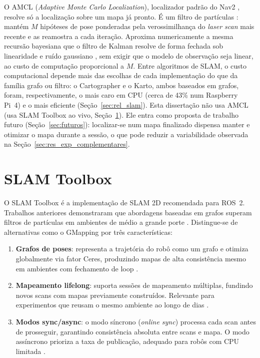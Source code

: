 O AMCL (\textit{Adaptive Monte Carlo Localization}), localizador padrão do
Nav2 \cite{macenski2020marathon}, resolve só a localização sobre um mapa já pronto. É um filtro de
partículas \cite{thrun2005}: mantém $M$ hipóteses de pose ponderadas pela verossimilhança do
\textit{laser scan} mais recente e as reamostra a cada iteração. Aproxima
numericamente a mesma recursão bayesiana que o filtro de Kalman resolve de
forma fechada sob linearidade e ruído gaussiano \cite{kalman1960}, sem exigir
que o modelo de observação seja linear, ao custo de computação proporcional a
$M$. Entre algoritmos de SLAM, o custo computacional depende mais das escolhas
de cada implementação do que da família grafo ou filtro: o Cartographer e o
Karto, ambos baseados em grafos, foram, respectivamente, o mais caro em CPU (cerca de 43\% num
Raspberry Pi~4) e o mais eficiente \cite{hamer2025} (Seção~\ref{sec:rel_slam}). Esta dissertação não usa AMCL (usa SLAM Toolbox ao vivo,
Seção~\ref{sec:slam_toolbox}). Ele entra como proposta de trabalho futuro
(Seção~\ref{sec:futuros}): localizar-se num mapa finalizado dispensa manter e
otimizar o mapa durante a sessão, o que pode reduzir a variabilidade observada
na Seção~\ref{sec:res_exp_complementares}.

\section{SLAM Toolbox}
\label{sec:slam_toolbox}

O SLAM Toolbox \cite{macenski2021slam} é a implementação de SLAM 2D recomendada
para ROS~2. Trabalhos anteriores demonstraram que abordagens baseadas em grafos
superam filtros de partículas em ambientes de médio a grande porte
\cite{bailey2006}. Distingue-se de alternativas como o GMapping
\cite{grisetti2007} por três características:

\begin{enumerate}
    \item \textbf{Grafos de poses}: representa a trajetória do robô como um grafo
    e otimiza globalmente via fator Ceres, produzindo mapas de alta consistência
    mesmo em ambientes com fechamento de loop \cite{macenski2021slam}.

    \item \textbf{Mapeamento lifelong}: suporta sessões de mapeamento múltiplas,
    fundindo novos scans com mapas previamente construídos. Relevante para
    experimentos que reusam o mesmo ambiente ao longo de dias \cite{macenski2021slam}.

    \item \textbf{Modos sync/async}: o modo síncrono (\textit{online sync})
    processa cada scan antes de prosseguir, garantindo consistência absoluta
    entre scans e mapa. O modo assíncrono prioriza a taxa de publicação,
    adequado para robôs com CPU limitada \cite{macenski2021slam}.
\end{enumerate}

